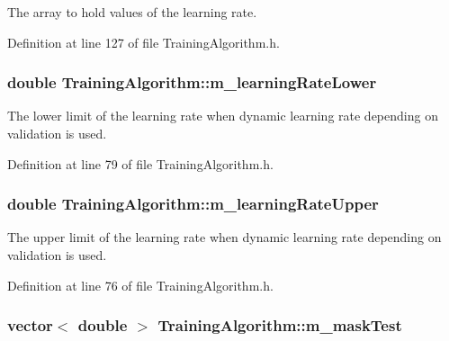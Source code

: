The array to hold values of the learning rate. 



Definition at line 127 of file Training\+Algorithm.\+h.

\subsubsection[{\texorpdfstring{m\+\_\+learning\+Rate\+Lower}{m_learningRateLower}}]{\setlength{\rightskip}{0pt plus 5cm}double Training\+Algorithm\+::m\+\_\+learning\+Rate\+Lower\hspace{0.3cm}{\ttfamily [private]}}\hypertarget{classTrainingAlgorithm_ac4432def3c47e16c1be6fd0a921b9fb0}{}\label{classTrainingAlgorithm_ac4432def3c47e16c1be6fd0a921b9fb0}


The lower limit of the learning rate when dynamic learning rate depending on validation is used. 



Definition at line 79 of file Training\+Algorithm.\+h.

\subsubsection[{\texorpdfstring{m\+\_\+learning\+Rate\+Upper}{m_learningRateUpper}}]{\setlength{\rightskip}{0pt plus 5cm}double Training\+Algorithm\+::m\+\_\+learning\+Rate\+Upper\hspace{0.3cm}{\ttfamily [private]}}\hypertarget{classTrainingAlgorithm_a420db73ebb56b3c910a3117f91a7e5a0}{}\label{classTrainingAlgorithm_a420db73ebb56b3c910a3117f91a7e5a0}


The upper limit of the learning rate when dynamic learning rate depending on validation is used. 



Definition at line 76 of file Training\+Algorithm.\+h.

\subsubsection[{\texorpdfstring{m\+\_\+mask\+Test}{m_maskTest}}]{\setlength{\rightskip}{0pt plus 5cm}vector$<$ double $>$ Training\+Algorithm\+::m\+\_\+mask\+Test\hspace{0.3cm}{\ttfamily [private]}}\hypertarget{classTrainingAlgorithm_acad03968ff1bf0e172f35a1f14c20db3}{}\label{classTrainingAlgorithm_acad03968ff1bf0e172f35a1f14c20db3}


